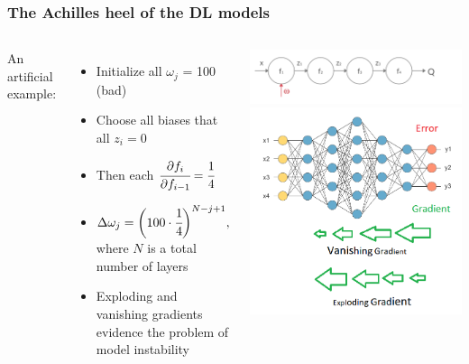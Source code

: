 \documentclass[12pt, aspectratio = 169]{beamer}
\newcommand{\red}{\color{calmRed}}
\newcommand{\black}{\color{black}}
\begin{document}

\begin{frame}[t]
	\frametitle{The Achilles heel of the DL models}
	\begin{columns}[T]
		\begin{minipage}[T]{\linewidth}
			An artificial example:
			\begin{itemize}
				\item Initialize all $\omega_j$ = 100 (\red bad\black)
				\onslide<3->\item Choose all biases that all $z_i = 0$
				\onslide<4->\item Then each $\cfrac{\partial f_i}{\partial f_{i-1}} = \cfrac{1}{4}$
				\onslide<5->\item $\Delta \omega_j = \bigg(100\cdot\cfrac{1}{4}\bigg)^{N-j+1},$\\
				\vspace{0.3em} where $N$ is a total number of layers
				\onslide<6->\item[\red \textbullet] Exploding and vanishing gradients evidence the problem of model instability
			\end{itemize}
		\end{minipage}%
		\begin{minipage}[T]{\linewidth}
			\centering
			\includegraphics[width=1\linewidth]{vanishing_grad_NN}\\
			\vspace{-0.5em}
			\onslide<5->\hspace{-1em}\includegraphics[width=0.7\linewidth]{unstable_grad_NN}
		\end{minipage}
	\end{columns}
	\vspace{1em}
\end{frame} 
\end{document}
